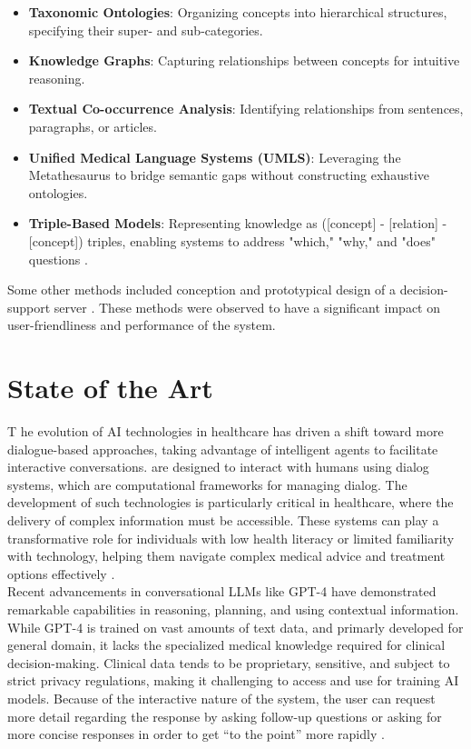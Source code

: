 \begin{itemize}
    \item \textcolor{TUMRed}{\textbf{Taxonomic Ontologies}}: Organizing concepts into hierarchical structures, specifying their super- and sub-categories.
    \item \textcolor{TUMRed}{\textbf{Knowledge Graphs}}: Capturing relationships between concepts for intuitive reasoning.
    \item \textcolor{TUMRed}{\textbf{Textual Co-occurrence Analysis}}: Identifying relationships from sentences, paragraphs, or articles.
    \item \textcolor{TUMRed}{\textbf{Unified Medical Language Systems (UMLS)}}: Leveraging the Metathesaurus to bridge semantic gaps without constructing exhaustive ontologies.
    \item \textcolor{TUMRed}{\textbf{Triple-Based Models}}: Representing knowledge as ([concept] - [relation] - [concept]) triples, enabling systems to address "which," "why," and "does" questions \cite{demner2009can}.
\end{itemize}

\noindent Some other methods included conception and prototypical design of a decision-support server \cite{eich1999internet}. These methods were observed to have a significant impact on user-friendliness and performance of the system.
\section{State of the Art}
\lettrine{T}{ }he evolution of AI technologies in healthcare has driven a shift toward more dialogue-based approaches, taking advantage of intelligent agents to facilitate interactive conversations. are designed to interact with humans using dialog systems, which are computational frameworks for managing dialog. The development of such technologies is particularly critical in healthcare, where the delivery of complex information must be accessible. These systems can play a transformative role for individuals with low health literacy or limited familiarity with technology, helping them navigate complex medical advice and treatment options effectively \cite{cohen2022intelligent}.\\[\baselineskip]

\noindent Recent advancements in conversational LLMs like GPT-4 have demonstrated remarkable capabilities in reasoning, planning, and using contextual information. While GPT-4 is trained on vast amounts of text data, and primarly developed for general domain, it lacks the specialized medical knowledge required for clinical decision-making. Clinical data tends to be proprietary, sensitive, and subject to strict privacy regulations, making it challenging to access and use for training AI models. Because of the interactive nature of the system, the user can request more detail regarding the response by asking follow-up questions or asking for more concise responses in order to get “to the point” more rapidly \cite{lee2023benefits}.\\[\baselineskip]


